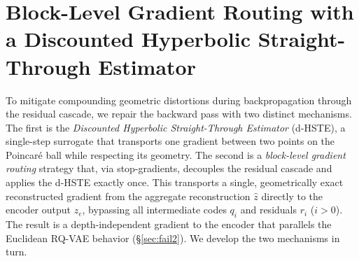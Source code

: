 \documentclass[12pt]{report}
\begin{document}
\section{Block-Level Gradient Routing with a Discounted Hyperbolic Straight-Through Estimator}
\label{sec:hste}
\label{sec:blockste}

To mitigate compounding geometric distortions during backpropagation through the residual cascade, we repair the backward pass with two distinct mechanisms. The first is the \emph{Discounted Hyperbolic Straight-Through Estimator} (d-HSTE), a single-step surrogate that transports one gradient between two points on the Poincar\'e ball while respecting its geometry. The second is a \emph{block-level gradient routing} strategy that, via stop-gradients, decouples the residual cascade and applies the d-HSTE exactly once. This transports a single, geometrically exact reconstructed gradient from the aggregate reconstruction $\hat z$ directly to the encoder output $z_e$, bypassing all intermediate codes $q_i$ and residuals $r_i$ ($i>0$). The result is a depth-independent gradient to the encoder that parallels the Euclidean RQ-VAE behavior (\S\ref{sec:fail2}). We develop the two mechanisms in turn.
\end{document}
